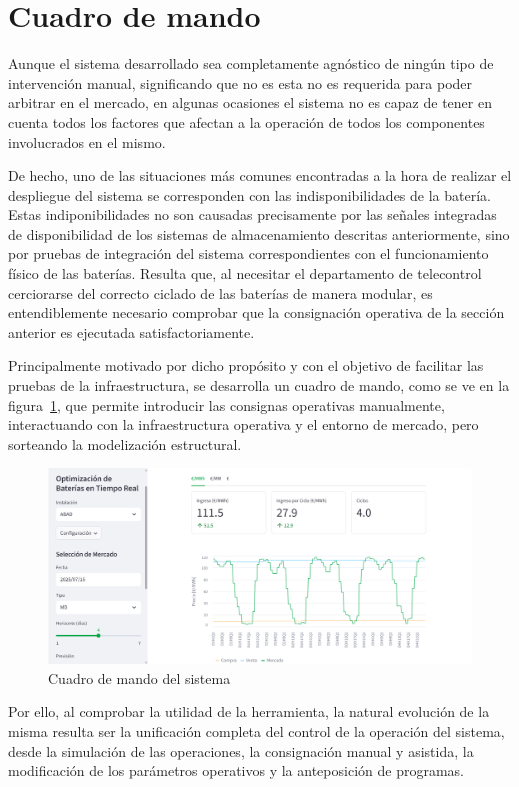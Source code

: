 \section{Cuadro de mando}
\label{makereference6.2}

Aunque el sistema desarrollado sea completamente agnóstico de ningún tipo de intervención manual, significando que no es esta no es requerida para poder arbitrar en el mercado, en algunas ocasiones el sistema no es capaz de tener en cuenta todos los factores que afectan a la operación de todos los componentes involucrados en el mismo.

De hecho, uno de las situaciones más comunes encontradas a la hora de realizar el despliegue del sistema se corresponden con las indisponibilidades de la batería. Estas indiponibilidades no son causadas precisamente por las señales integradas de disponibilidad de los sistemas de almacenamiento descritas anteriormente, sino por pruebas de integración del sistema correspondientes con el funcionamiento físico de las baterías. Resulta que, al necesitar el departamento de telecontrol cerciorarse del correcto ciclado de las baterías de manera modular, es entendiblemente necesario comprobar que la consignación operativa de la sección anterior es ejecutada satisfactoriamente.

Principalmente motivado por dicho propósito y con el objetivo de facilitar las pruebas de la infraestructura, se desarrolla un cuadro de mando, como se ve en la figura~\ref{fig:cuadro-de-mando}, que permite introducir las consignas operativas manualmente, interactuando con la infraestructura operativa y el entorno de mercado, pero sorteando la modelización  estructural.

\begin{figure}
\centering
\includegraphics[width=0.5\linewidth]{figures/cuadro-de-mando.png}
\caption{Cuadro de mando del sistema}
\label{fig:cuadro-de-mando}
\end{figure}

Por ello, al comprobar la utilidad de la herramienta, la natural evolución de la misma resulta ser la unificación completa del control de la operación del sistema, desde la simulación de las operaciones, la consignación manual y asistida, la modificación de los parámetros operativos y la anteposición de programas.

